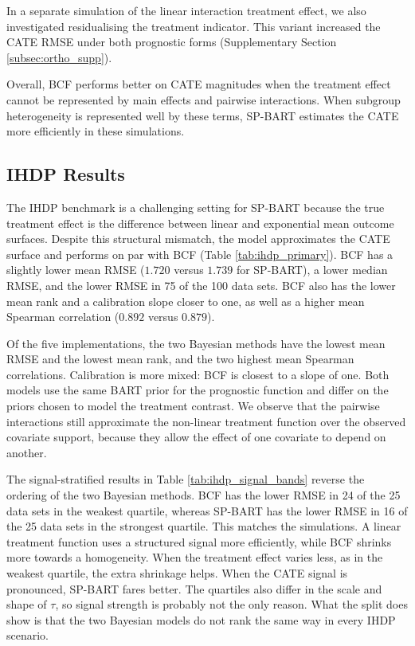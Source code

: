 \documentclass[12pt]{article}
\newcommand{\rev}[1]{\ifdefined\ReviewChanges{\color{revisionblue}#1}\else#1\fi}
\begin{document}
In a separate simulation of the linear interaction treatment effect, we also investigated residualising the treatment indicator. This variant increased the CATE RMSE under both prognostic forms (Supplementary Section \ref{subsec:ortho_supp}).

Overall, BCF performs better on CATE magnitudes when the treatment effect cannot be represented by main effects and pairwise interactions. When subgroup heterogeneity is represented well by these terms, \rev{SP-BART} estimates the CATE more efficiently in these simulations.

\subsection{IHDP Results}
\label{subsec:ihdp}

The IHDP benchmark is a challenging setting for \rev{SP-BART} because the true treatment effect is the difference between linear and exponential mean outcome surfaces. Despite this structural mismatch, the model approximates the CATE surface and performs on par with BCF (Table \ref{tab:ihdp_primary}). BCF has a slightly lower mean RMSE ($1.720$ versus $1.739$ for \rev{SP-BART}), a lower median RMSE, and the lower RMSE in 75 of the 100 data sets. BCF also has the lower mean rank and a calibration slope closer to one, as well as a higher mean Spearman correlation ($0.892$ versus $0.879$).

Of the five implementations, the two Bayesian methods have the lowest mean RMSE and the lowest mean rank, and the two highest mean Spearman correlations. Calibration is more mixed: BCF is closest to a slope of one. Both models use the same BART prior for the prognostic function and differ on the priors chosen to model the treatment contrast. We observe that the pairwise interactions still approximate the non-linear treatment function over the observed covariate support, because they allow the effect of one covariate to depend on another.

The signal-stratified results in Table \ref{tab:ihdp_signal_bands} reverse the ordering of the two Bayesian methods. BCF has the lower RMSE in 24 of the 25 data sets in the weakest quartile, whereas \rev{SP-BART} has the lower RMSE in 16 of the 25 data sets in the strongest quartile. This matches the simulations. A linear treatment function uses a structured signal more efficiently, while BCF shrinks more towards a homogeneity. When the treatment effect varies less, as in the weakest quartile, the extra shrinkage helps. When the CATE signal is pronounced, \rev{SP-BART} fares better. The quartiles also differ in the scale and shape of $\tau$, so signal strength is probably not the only reason. What the split does show is that the two Bayesian models do not rank the same way in every IHDP scenario.
\end{document}
